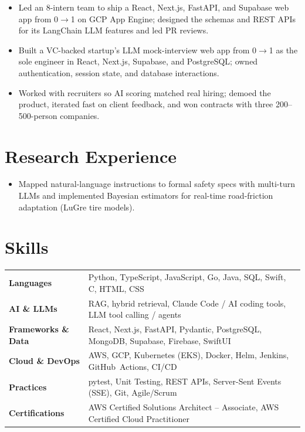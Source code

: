 \documentclass[11pt, letterpaper]{article}
\begin{document}
\vspace{1pt}
\begin{itemize}
  \item Led an 8-intern team to ship a React, Next.js, FastAPI, and Supabase web app from 0$\to$1 on GCP App Engine; designed the schemas and REST APIs for its LangChain LLM features and led PR reviews.
\end{itemize}

\vspace{1pt}
\begin{itemize}
  \item Built a VC-backed startup's LLM mock-interview web app from 0$\to$1 as the sole engineer in React, Next.js, Supabase, and PostgreSQL; owned authentication, session state, and database interactions.
  \item Worked with recruiters so AI scoring matched real hiring; demoed the product, iterated fast on client feedback, and won contracts with three 200--500-person companies.
\end{itemize}

\section{Research Experience}
\begin{itemize}
  \item Mapped natural-language instructions to formal safety specs with multi-turn LLMs and implemented Bayesian estimators for real-time road-friction adaptation (LuGre tire models).
\end{itemize}

\section{Skills}
\begin{tabularx}{\textwidth}{@{}l @{\hspace{7pt}} >{\raggedright\arraybackslash}X@{}}
  \textbf{Languages} & Python, TypeScript, JavaScript, Go, Java, SQL, Swift, C, HTML, CSS \\[1pt]
  \textbf{AI \& LLMs} & RAG, hybrid retrieval, Claude Code / AI coding tools, LLM tool calling / agents \\[1pt]
  \textbf{Frameworks \& Data} & React, Next.js, FastAPI, Pydantic, PostgreSQL, MongoDB, Supabase, Firebase, SwiftUI \\[1pt]
  \textbf{Cloud \& DevOps} & AWS, GCP, Kubernetes (EKS), Docker, Helm, Jenkins, GitHub~Actions, CI/CD \\[1pt]
  \textbf{Practices} & pytest, Unit Testing, REST APIs, Server-Sent Events (SSE), Git, Agile/Scrum \\[1pt]
  \textbf{Certifications} & AWS Certified Solutions Architect -- Associate, AWS Certified Cloud Practitioner \\
\end{tabularx}
\end{document}
